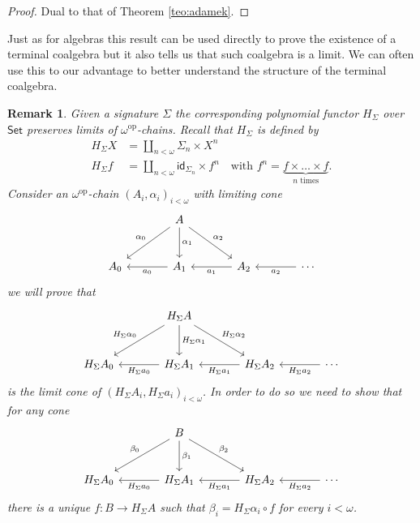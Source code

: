 \documentclass[letterpaper, 11pt, oneside]{memoir}
\theoremstyle{myteo}
\newtheorem{remark}[theorem]{Remark}
\numberwithin{equation}{section}
\newcommand{\id}{\textsf{id}}
\newcommand{\Set}{\textsf{Set}}
\newcommand{\op}{\text{op}}
\begin{document}
\begin{proof}
  Dual to that of Theorem \ref{teo:adamek}.
\end{proof}

Just as for algebras this result can be used directly to prove the existence of a terminal coalgebra but it also tells us that such coalgebra is a limit.
We can often use this to our advantage to better understand the structure of the terminal coalgebra.

\begin{remark}
  \label{rem:polynomial-preserve-limits}
  Given a signature \(\Sigma\) the corresponding polynomial functor \(H_\Sigma\) over \(\Set\) preserves limits of \(\omega^\op\)-chains.
  Recall that \(H_\Sigma\) is defined by
  \begin{align*}
    H_\Sigma X &= \coprod_{n < \omega} \Sigma_n \times X^n \\
    H_\Sigma f &= \coprod_{n < \omega} \id_{\Sigma_n} \times f^n \quad \text{with } f^n = \underbrace{f \times \ldots \times f}_{\text{\(n\) times}}.
  \end{align*}
  Consider an \(\omega^\op\)-chain \((A_i, \alpha_i)_{i < \omega}\) with limiting cone
  \begin{equation*}
    \begin{tikzcd}[sep = large]
      & A \ar[dl, "\alpha_0"'] \ar[d, "\alpha_1"] \ar[dr, "\alpha_2"] & & \\
      A_0 & A_1 \ar[l, "a_0"] & A_2 \ar[l, "a_1"] & \cdots \ar[l, "a_2"]
    \end{tikzcd}
  \end{equation*}
  we will prove that
  \begin{equation*}
    \begin{tikzcd}[sep = large]
      & H_\Sigma A \ar[dl, "H_\Sigma \alpha_0"'] \ar[d, "H_\Sigma \alpha_1"] \ar[dr, "H_\Sigma \alpha_2"] & & \\
      H_\Sigma A_0 & H_\Sigma A_1 \ar[l, "H_\Sigma a_0"] & H_\Sigma A_2 \ar[l, "H_\Sigma a_1"] & \cdots \ar[l, "H_\Sigma a_2"]
    \end{tikzcd}
  \end{equation*}
  is the limit cone of \((H_\Sigma A_i, H_\Sigma a_i)_{i < \omega}\).
  In order to do so we need to show that for any cone
  \begin{equation*}
    \begin{tikzcd}[sep = large]
      & B \ar[dl, "\beta_0"'] \ar[d, "\beta_1"] \ar[dr, "\beta_2"] & & \\
      H_\Sigma A_0 & H_\Sigma A_1 \ar[l, "H_\Sigma a_0"] & H_\Sigma A_2 \ar[l, "H_\Sigma a_1"] & \cdots \ar[l, "H_\Sigma a_2"]
    \end{tikzcd}
  \end{equation*}
  there is a unique \(f : B \to H_\Sigma A\) such that \(\beta_i = H_\Sigma \alpha_i \circ f\) for every \(i < \omega\).


\end{remark}
\end{document}
